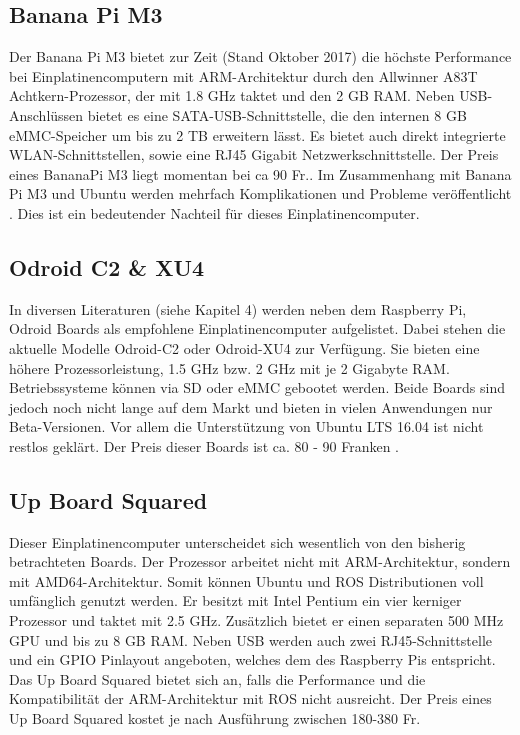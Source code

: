 \subsection{Banana Pi M3}
\label{subsec:BananaPi}
Der Banana Pi M3 bietet zur Zeit (Stand Oktober 2017) die höchste Performance bei Einplatinencomputern mit \ac{ARM}-Architektur durch den Allwinner A83T Achtkern-Prozessor, der mit 1.8 GHz taktet und den 2 GB RAM. Neben USB-Anschlüssen bietet es eine SATA-USB-Schnittstelle, die den internen 8 GB \ac{eMMC}-Speicher um bis zu 2 TB erweitern lässt. Es bietet auch direkt integrierte WLAN-Schnittstellen, sowie eine RJ45 Gigabit Netzwerkschnittstelle. Der Preis eines BananaPi M3 liegt momentan bei ca 90 Fr.. Im Zusammenhang mit Banana Pi M3 und Ubuntu werden mehrfach Komplikationen und Probleme veröffentlicht \cite{rpi} \cite{banana}. Dies ist ein bedeutender Nachteil für dieses Einplatinencomputer. 

\subsection{Odroid C2 \& XU4} 
\label{subsec:Odroid}
In diversen Literaturen (siehe \cite{ROSprojects} Kapitel 4) werden neben dem Raspberry Pi, Odroid Boards als empfohlene Einplatinencomputer aufgelistet. Dabei stehen die aktuelle Modelle Odroid-C2 oder Odroid-XU4 zur Verfügung. Sie bieten eine höhere Prozessorleistung, 1.5 GHz bzw. 2 GHz mit je 2 Gigabyte \ac{RAM}. Betriebssysteme können via \ac{SD} oder \ac{eMMC} gebootet werden. Beide Boards sind jedoch noch nicht lange auf dem Markt und bieten in vielen Anwendungen nur Beta-Versionen. Vor allem die Unterstützung von Ubuntu LTS 16.04 ist nicht restlos geklärt. Der Preis dieser Boards ist ca. 80 - 90 Franken \cite{rpi}.

\subsection{Up Board Squared} 
\label{subsec:Up Board Squared}
Dieser Einplatinencomputer unterscheidet sich wesentlich von den bisherig betrachteten Boards. Der Prozessor arbeitet nicht mit \ac{ARM}-Architektur, sondern mit \ac{AMD64}-Architektur. Somit können Ubuntu und ROS Distributionen voll umfänglich genutzt werden. Er besitzt mit Intel Pentium ein vier kerniger Prozessor und taktet mit 2.5 GHz. Zusätzlich bietet er einen separaten 500 MHz \ac{GPU} und bis zu 8 GB \ac{RAM}. Neben USB werden auch zwei RJ45-Schnittstelle und ein GPIO Pinlayout angeboten, welches dem des Raspberry Pis entspricht. Das Up Board Squared bietet sich an, falls die Performance und die Kompatibilität der ARM-Architektur mit ROS nicht ausreicht. Der Preis eines Up Board Squared kostet je nach Ausführung zwischen 180-380 Fr.

